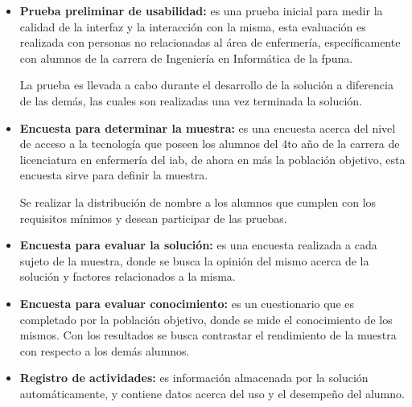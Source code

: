 \begin{itemize}

    \item \textbf{Prueba preliminar de usabilidad:} es una prueba inicial para
        medir la calidad de la interfaz y la interacción con la misma, esta
        evaluación es realizada con personas no relacionadas al área de
        enfermería, específicamente con alumnos de la carrera de
        Ingeniería en Informática de la \gls{fpuna}.

        La prueba es llevada a cabo durante el desarrollo de la solución a
        diferencia de las demás, las cuales son realizadas una vez terminada la
        solución.

    \item \textbf{Encuesta para determinar la muestra:} es una encuesta acerca del nivel de
        acceso a la tecnología que poseen los alumnos del 4to año  de la carrera 
        de licenciatura en enfermería del \Gls{iab},
        de ahora en más la población objetivo, esta encuesta sirve para definir
        la muestra.

        Se realizar la distribución de \gls{nombre} a los
        alumnos que cumplen con los requisitos mínimos y desean participar de
        las pruebas.%

    \item \textbf{Encuesta para evaluar la solución:} es una encuesta realizada
        a cada sujeto de la muestra, donde se busca la opinión del mismo acerca
        de la solución y factores relacionados a la misma. 

    \item \textbf{Encuesta para evaluar conocimiento:} es un cuestionario que es
        completado por la población objetivo, donde se mide el conocimiento de
        los mismos. Con los resultados se busca contrastar el rendimiento de la muestra 
        con respecto a los demás alumnos.
        

%        
        
    \item \textbf{Registro de actividades:} es información almacenada por la
        solución automáticamente, y contiene datos acerca del uso y el desempeño
        del alumno.
        
\end{itemize}

